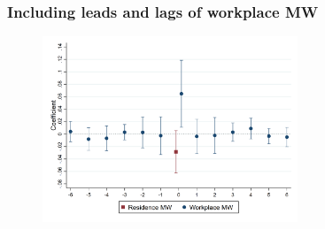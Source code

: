\documentclass[aspectratio=169, t]{beamer}
\begin{document}
\begin{frame}[label = dyn_baseline_plot]
    \frametitle{Including leads and lags of workplace MW}

    \begin{figure}
        \centering
        \includegraphics[width=0.68\textwidth]{fd_baseline/output/fd_both_mw_wkp_only_dynamic.png}
    \end{figure}
    
    \hyperlink{exclude_res}{}
    \hyperlink{res_only_dyn}{}
    \hyperlink{both_dyn}{}
\end{frame}
\end{document}
